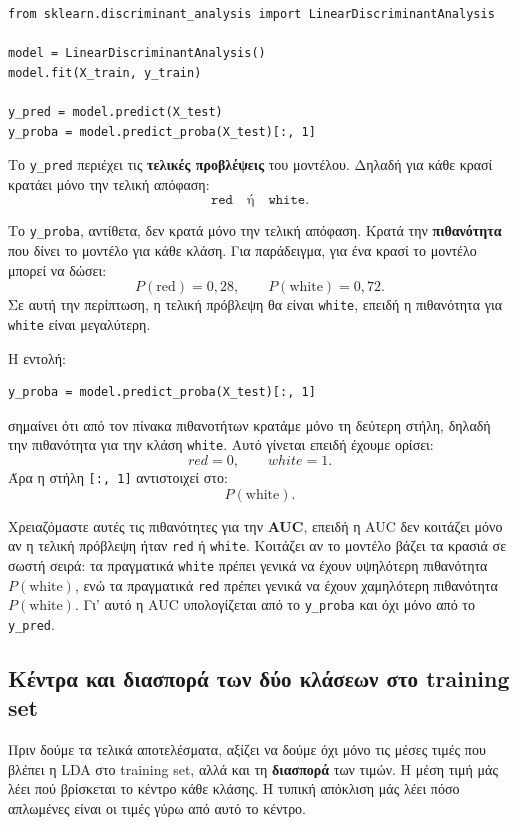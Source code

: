 \documentclass[11pt,a4paper]{article}
\newcommand{\code}[1]{\texttt{#1}}
\begin{document}
\begin{lstlisting}
from sklearn.discriminant_analysis import LinearDiscriminantAnalysis

model = LinearDiscriminantAnalysis()
model.fit(X_train, y_train)

y_pred = model.predict(X_test)
y_proba = model.predict_proba(X_test)[:, 1]
\end{lstlisting}

Το \code{y\_pred} περιέχει τις \textbf{τελικές προβλέψεις} του μοντέλου.
Δηλαδή για κάθε κρασί κρατάει μόνο την τελική απόφαση:
\[
\code{red} \quad \text{ή} \quad \code{white}.
\]

Το \code{y\_proba}, αντίθετα, δεν κρατά μόνο την τελική απόφαση. Κρατά την
\textbf{πιθανότητα} που δίνει το μοντέλο για κάθε κλάση. Για παράδειγμα, για
ένα κρασί το μοντέλο μπορεί να δώσει:
\[
P(\text{red}) = 0{,}28,
\qquad
P(\text{white}) = 0{,}72.
\]
Σε αυτή την περίπτωση, η τελική πρόβλεψη θα είναι \code{white}, επειδή η
πιθανότητα για \code{white} είναι μεγαλύτερη.

Η εντολή:
\begin{lstlisting}
y_proba = model.predict_proba(X_test)[:, 1]
\end{lstlisting}
σημαίνει ότι από τον πίνακα πιθανοτήτων κρατάμε μόνο τη δεύτερη στήλη, δηλαδή
την πιθανότητα για την κλάση \code{white}. Αυτό γίνεται επειδή έχουμε ορίσει:
\[
red = 0, \qquad white = 1.
\]
Άρα η στήλη \code{[:, 1]} αντιστοιχεί στο:
\[
P(\text{white}).
\]

Χρειαζόμαστε αυτές τις πιθανότητες για την \textbf{AUC}, επειδή η AUC δεν
κοιτάζει μόνο αν η τελική πρόβλεψη ήταν \code{red} ή \code{white}. Κοιτάζει
αν το μοντέλο βάζει τα κρασιά σε σωστή σειρά: τα πραγματικά \code{white}
πρέπει γενικά να έχουν υψηλότερη πιθανότητα \(P(\text{white})\), ενώ τα
πραγματικά \code{red} πρέπει γενικά να έχουν χαμηλότερη πιθανότητα
\(P(\text{white})\). Γι' αυτό η AUC υπολογίζεται από το \code{y\_proba} και
όχι μόνο από το \code{y\_pred}.

\subsection{Κέντρα και διασπορά των δύο κλάσεων στο training set}

Πριν δούμε τα τελικά αποτελέσματα, αξίζει να δούμε όχι μόνο τις μέσες τιμές
που βλέπει η LDA στο training set, αλλά και τη \textbf{διασπορά} των τιμών.
Η μέση τιμή μάς λέει πού βρίσκεται το κέντρο κάθε κλάσης. Η τυπική απόκλιση
μάς λέει πόσο απλωμένες είναι οι τιμές γύρω από αυτό το κέντρο.
\end{document}
